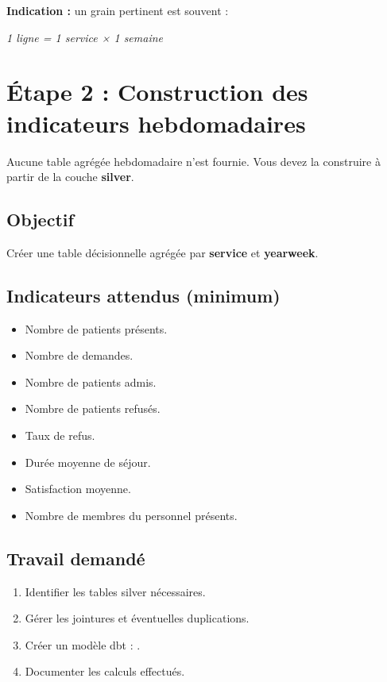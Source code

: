 \documentclass[11pt,a4paper]{article}
\begin{document}
\textbf{Indication :}
un grain pertinent est souvent :
\begin{center}
\textit{1 ligne = 1 service × 1 semaine}
\end{center}



\section{Étape 2 : Construction des indicateurs hebdomadaires}

Aucune table agrégée hebdomadaire n’est fournie.
Vous devez la construire à partir de la couche \textbf{silver}.

\subsection*{Objectif}

Créer une table décisionnelle agrégée par \textbf{service} et \textbf{yearweek}.

\subsection*{Indicateurs attendus (minimum)}

\begin{itemize}
  \item Nombre de patients présents.
  \item Nombre de demandes.
  \item Nombre de patients admis.
  \item Nombre de patients refusés.
  \item Taux de refus.
  \item Durée moyenne de séjour.
  \item Satisfaction moyenne.
  \item Nombre de membres du personnel présents.
\end{itemize}

\subsection*{Travail demandé}

\begin{enumerate}
  \item Identifier les tables silver nécessaires.
  \item Gérer les jointures et éventuelles duplications.
  \item Créer un modèle dbt : .
  \item Documenter les calculs effectués.
\end{enumerate}
\end{document}
